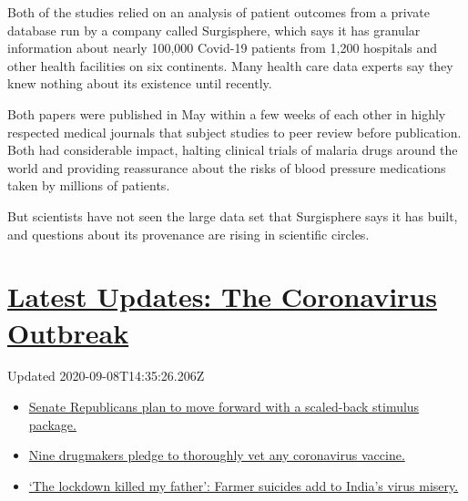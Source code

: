 Both of the studies relied on an analysis of patient outcomes from a
private database run by a company called Surgisphere, which says it has
granular information about nearly 100,000 Covid-19 patients from 1,200
hospitals and other health facilities on six continents. Many health
care data experts say they knew nothing about its existence until
recently.

Both papers were published in May within a few weeks of each other in
highly respected medical journals that subject studies to peer review
before publication. Both had considerable impact, halting clinical
trials of malaria drugs around the world and providing reassurance about
the risks of blood pressure medications taken by millions of patients.

But scientists have not seen the large data set that Surgisphere says it
has built, and questions about its provenance are rising in scientific
circles.

\hypertarget{latest-updates-the-coronavirus-outbreak}{%
\section{\texorpdfstring{\href{https://www.nytimes3xbfgragh.onion/2020/09/08/world/covid-19-coronavirus.html?action=click\&pgtype=Article\&state=default\&region=MAIN_CONTENT_1\&context=storylines_live_updates}{Latest
Updates: The Coronavirus
Outbreak}}{Latest Updates: The Coronavirus Outbreak}}\label{latest-updates-the-coronavirus-outbreak}}

Updated 2020-09-08T14:35:26.206Z

\begin{itemize}
\tightlist
\item
  \href{https://www.nytimes3xbfgragh.onion/2020/09/08/world/covid-19-coronavirus.html?action=click\&pgtype=Article\&state=default\&region=MAIN_CONTENT_1\&context=storylines_live_updates\#link-547feae1}{Senate
  Republicans plan to move forward with a scaled-back stimulus package.}
\item
  \href{https://www.nytimes3xbfgragh.onion/2020/09/08/world/covid-19-coronavirus.html?action=click\&pgtype=Article\&state=default\&region=MAIN_CONTENT_1\&context=storylines_live_updates\#link-679303d7}{Nine
  drugmakers pledge to thoroughly vet any coronavirus vaccine.}
\item
  \href{https://www.nytimes3xbfgragh.onion/2020/09/08/world/covid-19-coronavirus.html?action=click\&pgtype=Article\&state=default\&region=MAIN_CONTENT_1\&context=storylines_live_updates\#link-1c973131}{`The
  lockdown killed my father': Farmer suicides add to India's virus
  misery.}
\end{itemize}

